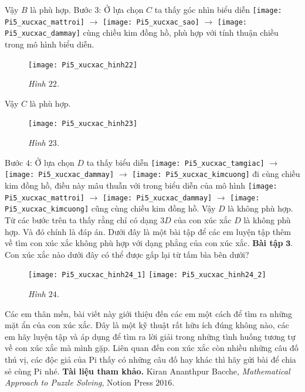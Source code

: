 \begin{multicols}{2}
\begin{figure}[H]
	\end{figure}
	Vậy $B$ là phù hợp.
	\vskip 0.1cm
	Bước $3$: Ở lựa chọn $C$ ta thấy góc nhìn biểu diễn  \texttt{[image: Pi5\_xucxac\_mattroi]} $\to$ \texttt{[image: Pi5\_xucxac\_sao]} $\to$
	\texttt{[image: Pi5\_xucxac\_dammay]} cùng chiều kim đồng hồ, phù hợp với tính thuận chiều trong mô hình biểu diễn.
	\begin{figure}[H]
		\vspace*{-5pt}
		\centering
		\captionsetup{labelformat= empty, justification=centering}
		\texttt{[image: Pi5\_xucxac\_hinh22]}
		\caption{\small\textit{\color{toancuabi}Hình $22$.}}
		\vspace*{-10pt}
	\end{figure}
	Vậy $C$ là phù hợp.
	\begin{figure}[H]
		\vspace*{-5pt}
		\centering
		\captionsetup{labelformat= empty, justification=centering}
		\texttt{[image: Pi5\_xucxac\_hinh23]}
		\caption{\small\textit{\color{toancuabi}Hình $23$.}}
		\vspace*{-5pt}
	\end{figure}
	Bước $4$: Ở lựa chọn $D$ ta thấy biểu diễn \texttt{[image: Pi5\_xucxac\_tamgiac]} $\to$ \texttt{[image: Pi5\_xucxac\_dammay]} $\to$
	\texttt{[image: Pi5\_xucxac\_kimcuong]} đi cùng chiều kim đồng hồ, điều này mâu thuẫn với trong biểu diễn của mô hình \texttt{[image: Pi5\_xucxac\_mattroi]} $\to$ \texttt{[image: Pi5\_xucxac\_dammay]} $\to$
	\texttt{[image: Pi5\_xucxac\_kimcuong]}  cũng cùng chiều kim đồng hồ.
	\vskip 0.1cm
	Vậy $D$ là không phù hợp.
	\vskip 0.1cm
	Từ các bước trên ta thấy rằng chỉ có dạng $3D$ của con xúc xắc $D$ là không phù hợp. Và đó chính là đáp án.
	\vskip 0.1cm
	Dưới đây là một bài tập để các em luyện tập thêm về tìm con xúc xắc không phù hợp với dạng phẳng của con xúc xắc.
	\vskip 0.1cm
	\textbf{\color{toancuabi}Bài tập} $\pmb{3.}$ Con xúc xắc nào dưới đây có thể được gấp lại từ tấm bìa bên dưới?
	\begin{figure}[H]
		\vspace*{-5pt}
		\centering
		\captionsetup{labelformat= empty, justification=centering}
		\texttt{[image: Pi5\_xucxac\_hinh24\_1]}
		\texttt{[image: Pi5\_xucxac\_hinh24\_2]}
		\caption{\small\textit{\color{toancuabi}Hình $24$.}}
		\vspace*{-10pt}
	\end{figure}
	Các em thân mến, bài viết này giới thiệu đến các em một cách để tìm ra những mặt ẩn của con xúc xắc. Đây là một kỹ thuật rất hữu ích đúng không nào, các em hãy luyện tập và áp dụng để tìm ra lời giải trong những tình huống tương tự về con xúc xắc mà mình gặp. Liên quan đến con xúc xắc còn nhiều những câu đố thú vị, các độc giả của Pi thấy có những câu đố hay khác thì hãy gửi bài để chia sẻ cùng Pi nhé.   
	\vskip 0.1cm
	\textbf{\color{toancuabi}Tài liệu tham khảo.}
	Kiran Ananthpur Bacche, \textit{Mathematical Approach to Puzzle Solving}, Notion Press $2016$.	
\end{multicols}
